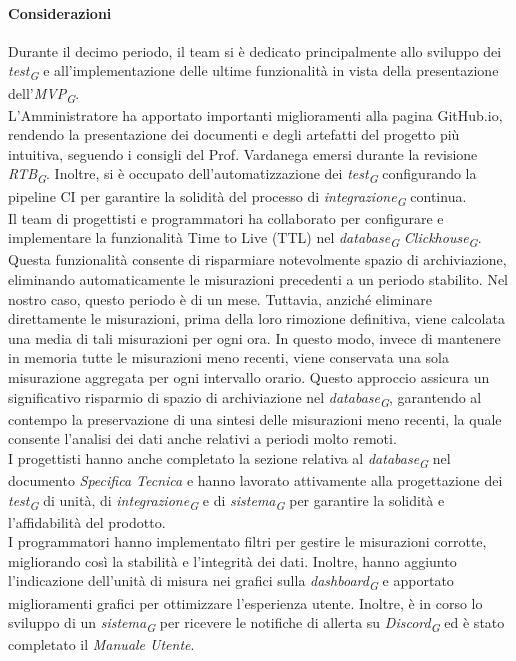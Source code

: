 \paragraph{Considerazioni}
Durante il decimo periodo, il team si è dedicato principalmente allo sviluppo dei \textit{test}\textsubscript{\textit{G}} e all'implementazione delle ultime funzionalità in vista della presentazione dell'\textit{MVP}\textsubscript{\textit{G}}. \\
L'Amministratore ha apportato importanti miglioramenti alla pagina GitHub.io, rendendo la presentazione dei documenti e degli artefatti del progetto più intuitiva, seguendo i consigli del Prof. Vardanega emersi durante la revisione \textit{RTB}\textsubscript{\textit{G}}. Inoltre, si è occupato dell'automatizzazione dei \textit{test}\textsubscript{\textit{G}} configurando la pipeline CI per garantire la solidità del processo di \textit{integrazione}\textsubscript{\textit{G}} continua. \\
Il team di progettisti e programmatori ha collaborato per configurare e implementare la funzionalità Time to Live (TTL) nel \textit{database}\textsubscript{\textit{G}} \textit{Clickhouse}\textsubscript{\textit{G}}. Questa funzionalità consente di risparmiare notevolmente spazio di archiviazione, eliminando automaticamente le misurazioni precedenti a un periodo stabilito. Nel nostro caso, questo periodo è di un mese. Tuttavia, anziché eliminare direttamente le misurazioni, prima della loro rimozione definitiva, viene calcolata una media di tali misurazioni per ogni ora. In questo modo, invece di mantenere in memoria tutte le misurazioni meno recenti, viene conservata una sola misurazione aggregata per ogni intervallo orario. Questo approccio assicura un significativo risparmio di spazio di archiviazione nel \textit{database}\textsubscript{\textit{G}}, garantendo al contempo la preservazione di una sintesi delle misurazioni meno recenti, la quale consente l'analisi dei dati anche relativi a periodi molto remoti. \\
I progettisti hanno anche completato la sezione relativa al \textit{database}\textsubscript{\textit{G}} nel documento \textit{Specifica Tecnica} e hanno lavorato attivamente alla progettazione dei \textit{test}\textsubscript{\textit{G}} di unità, di \textit{integrazione}\textsubscript{\textit{G}} e di \textit{sistema}\textsubscript{\textit{G}} per garantire la solidità e l'affidabilità del prodotto. \\
I programmatori hanno implementato filtri per gestire le misurazioni corrotte, migliorando così la stabilità e l'integrità dei dati. Inoltre, hanno aggiunto l'indicazione dell'unità di misura nei grafici sulla \textit{dashboard}\textsubscript{\textit{G}} e apportato miglioramenti grafici per ottimizzare l'esperienza utente. Inoltre, è in corso lo sviluppo di un \textit{sistema}\textsubscript{\textit{G}} per ricevere le notifiche di allerta su \textit{Discord}\textsubscript{\textit{G}} ed è stato completato il \textit{Manuale Utente}. \\

